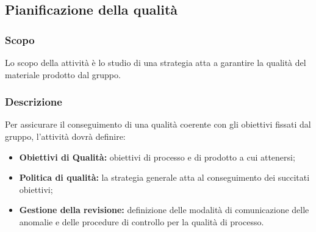 \documentclass[../NormediProgetto.tex]{subfiles}
\begin{document}

\subsection{Pianificazione della qualità}

\subsubsection{Scopo}

Lo scopo della attività è lo studio di una strategia atta a garantire la qualità del materiale prodotto dal gruppo. 

\subsubsection{Descrizione}

Per assicurare il conseguimento di una qualità coerente con gli obiettivi fissati dal gruppo, l'attività dovrà definire:

\begin{itemize}
	    
	\item \textbf{Obiettivi di Qualità:} obiettivi di processo e di prodotto a cui attenersi;
	
    \item \textbf{Politica di qualità:} la strategia generale atta al conseguimento dei succitati obiettivi;

    \item \textbf{Gestione della revisione:} definizione delle modalità di comunicazione delle anomalie e delle procedure di controllo per la qualità di processo.
\end{itemize}
\end{document}
